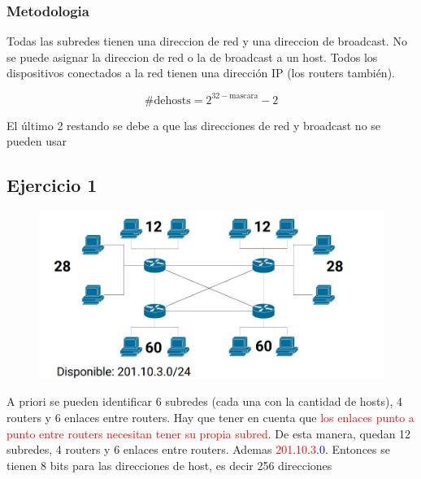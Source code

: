 \subsubsection{Metodologia}
Todas las subredes tienen una direccion de red y una direccion de broadcast. No se puede asignar la direccion de red o la de broadcast a un host. Todos los dispositivos conectados a la red tienen una dirección IP (los routers también).

$$ \mathrm{\# de hosts} = 2^{32-\mathrm{mascara}}-2 $$ 

El último 2 restando se debe a que las direcciones de red y broadcast no se pueden usar

\subsection{Ejercicio 1}

\begin{figure}[H]
\centering
\includegraphics[width=\textwidth]{imagenes/enunciado1subnetting.png}
\end{figure}

A priori se pueden identificar 6 subredes (cada una con la cantidad de hosts), 4 routers y 6 enlaces entre routers. Hay que tener en cuenta que \textcolor{red}{los enlaces punto a punto entre routers necesitan tener su propia subred}. De esta manera, quedan 12 subredes, 4 routers y 6 enlaces entre routers. Ademas \textcolor{red}{201}.\textcolor{red}{10}.\textcolor{red}{3}.\textcolor{blue}{0}. Entonces se tienen 8 bits para las direcciones de host, es decir 256 direcciones

